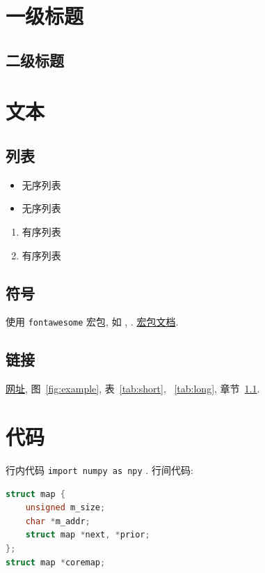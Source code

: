 \documentclass[a4paper,utf8]{ctexart}
\begin{document}
\maketitle

\section{一级标题}
\subsection{二级标题}\label{sec:sec1}

\section{文本}
\subsection{列表}
\begin{itemize}
    \item 无序列表
    \item 无序列表
\end{itemize}

\begin{enumerate}
    \item 有序列表
    \item 有序列表
\end{enumerate}

\subsection{符号}
使用 \verb|fontawesome| 宏包, 如 \faGithub, \faLink. \href{http://mirrors.ibiblio.org/CTAN/fonts/fontawesome/doc/fontawesome.pdf}{宏包文档}.

\subsection{链接}
\href{https://ysyszheng.github.io/}{网址}, 图~\ref{fig:example}, 表~\ref{tab:short}, ~\ref{tab:long}, 章节~\ref{sec:sec1}.

\section{代码}
行内代码 \verb|import numpy as npy| .
行间代码:
\begin{lstlisting}[language=C]
struct map {
    unsigned m_size;
    char *m_addr;
    struct map *next, *prior;
};
struct map *coremap;
\end{lstlisting}
\end{document}
